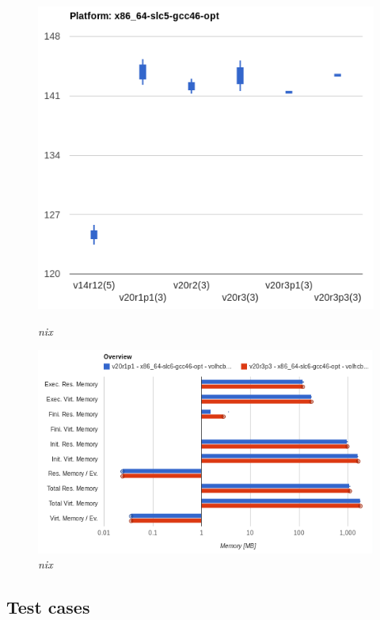 \documentclass[a4paper]{jpconf}
\begin{document}
\begin{figure}[t]
\begin{minipage}[t]{17pc}
\includegraphics[scale=0.4]{figures/moore_trend_analysis.png}
\caption{\small \textit{nix}}
\label{fig:trend}
\end{minipage}\hspace{1pc}%
\begin{minipage}[t]{17pc}
\includegraphics[scale=0.4]{figures/moore_overview_memory.png}
\caption{\small \textit{nix}}
\label{fig:overview}
\end{minipage}
\end{figure}

\subsection{Test cases}
\label{sec:test_cases}
\end{document}
